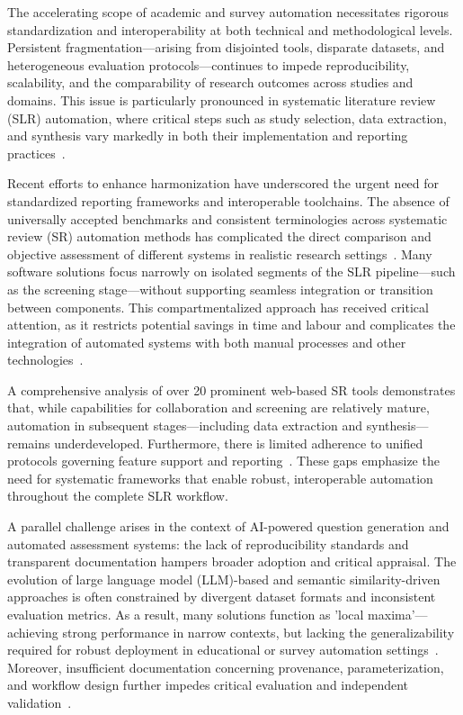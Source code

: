 \documentclass[11pt]{article}
\begin{document}
The accelerating scope of academic and survey automation necessitates rigorous standardization and interoperability at both technical and methodological levels. Persistent fragmentation—arising from disjointed tools, disparate datasets, and heterogeneous evaluation protocols—continues to impede reproducibility, scalability, and the comparability of research outcomes across studies and domains. This issue is particularly pronounced in systematic literature review (SLR) automation, where critical steps such as study selection, data extraction, and synthesis vary markedly in both their implementation and reporting practices~\cite{ref29,ref37,ref38,ref43,ref61,ref62,ref63,ref68,ref78,ref80,ref86,ref87,ref88,ref89,ref90,ref96,ref98,ref106}.

Recent efforts to enhance harmonization have underscored the urgent need for standardized reporting frameworks and interoperable toolchains. The absence of universally accepted benchmarks and consistent terminologies across systematic review (SR) automation methods has complicated the direct comparison and objective assessment of different systems in realistic research settings~\cite{ref37,ref63,ref86,ref106}. Many software solutions focus narrowly on isolated segments of the SLR pipeline—such as the screening stage—without supporting seamless integration or transition between components. This compartmentalized approach has received critical attention, as it restricts potential savings in time and labour and complicates the integration of automated systems with both manual processes and other technologies~\cite{ref29,ref37,ref38,ref80}.

A comprehensive analysis of over 20 prominent web-based SR tools demonstrates that, while capabilities for collaboration and screening are relatively mature, automation in subsequent stages—including data extraction and synthesis—remains underdeveloped. Furthermore, there is limited adherence to unified protocols governing feature support and reporting~\cite{ref29,ref62,ref63,ref68,ref78}. These gaps emphasize the need for systematic frameworks that enable robust, interoperable automation throughout the complete SLR workflow.

A parallel challenge arises in the context of AI-powered question generation and automated assessment systems: the lack of reproducibility standards and transparent documentation hampers broader adoption and critical appraisal. The evolution of large language model (LLM)-based and semantic similarity-driven approaches is often constrained by divergent dataset formats and inconsistent evaluation metrics. As a result, many solutions function as 'local maxima'—achieving strong performance in narrow contexts, but lacking the generalizability required for robust deployment in educational or survey automation settings~\cite{ref1,ref2,ref5,ref9,ref10}. Moreover, insufficient documentation concerning provenance, parameterization, and workflow design further impedes critical evaluation and independent validation~\cite{ref9,ref30,ref43,ref61,ref96,ref98}.
\end{document}
